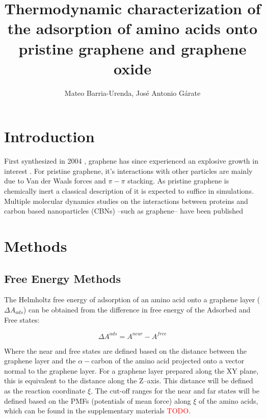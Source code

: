 \documentclass[twoside,twocolumn,9pt]{article}
\author{Mateo Barria-Urenda, José Antonio Gárate}
\title{Thermodynamic characterization of the adsorption of amino acids
  onto pristine graphene and graphene oxide}
\date{}
\begin{document}
\maketitle

\abstract{}

\section{Introduction}


First synthesized in 2004 \cite{Novoselov_2004}, graphene has since
experienced an explosive growth in interest \cite{Randviir_2014}.  For
pristine graphene, it's interactions with other particles are mainly
due to Van der Waals forces and $\pi-\pi$ stacking. \cite{Zuo_2012} As
pristine graphene is chemically inert \cite{Eftekhari_2017} a
classical description of it is expected to suffice in simulations.
Multiple molecular dynamics studies on the interactions between
proteins and carbon based nanoparticles (CBNs) --such as graphene--
have been published \cite{Zheng_2003, Ge_2011, Zuo_2012, Chong_2015,
  Duan_2015, Shityakov_2015, Al_Qattan_2018,Puigpelat_2019,
  Gonz_lez_Durruthy_2020, Li_2020}





\section{Methods}

\subsection{Free Energy Methods}

The Helmholtz free energy of adsorption of an amino acid onto a
graphene layer ($\Delta A_{ads}$) can be obtained from the difference
in free energy of the Adsorbed and Free states:

\begin{equation}
\label{eq:Adsorption}
\Delta A^{ads} = A^{near} - A^{free}
\end{equation}

Where the near and free states are defined based on the
distance between the graphene layer and the $\alpha-$carbon of the
amino acid projected onto a vector normal to the graphene layer. For a
graphene layer prepared along the XY plane, this is equivalent to the
distance along the Z--axis. This distance will be defined as the
reaction coordinate $\xi$. The cut-off ranges for the near and far
states will be defined based on the PMFs (potentials of mean force)
along $\xi$ of the amino acids, which can be found in the
supplementary materials \textcolor{red}{TODO}.
\end{document}
